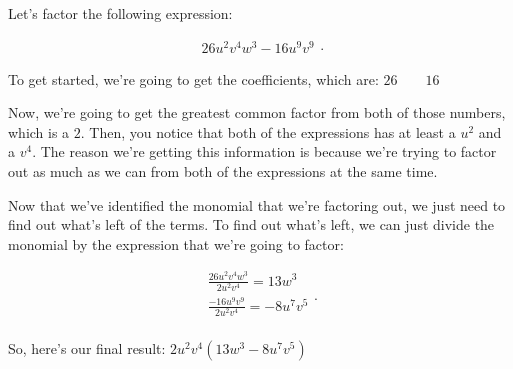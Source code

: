\label{les_4_unit_3:factor_out_a_monomial_from_a_polynomial}

Let's factor the following expression:

\begin{equation}
  \label{eqt:following_polynomial_expression}
  \begin{split}
    26u^{2}v^{4}w^{3} - 16u^{9}v^{9}
  \end{split}
.\end{equation}

To get started, we're going to get the coefficients, which are:
$26 \qquad 16$ 

Now, we're going to get the greatest common factor from both of those
numbers, which is a $2$. Then, you notice that both of the expressions has at
least a $u^{2}$ and a $v^{4}$. The reason we're getting this
information is because we're trying to factor out as much as we can from
both of the expressions at the same time.

Now that we've identified the monomial that we're factoring out, we just
need to find out what's left of the terms. To find out what's left, we can
just divide the monomial by the expression that we're going to factor:

\begin{equation}
  \label{eqt:divide_monomial_polynomial}
  \begin{split}
    \frac{26u^{2}v^{4}w^{3}}{2u^{2}v^{4}} = 13w^{3} \\
    \frac{-16u^{9}v^{9}}{2u^{2}v^{4}} = -8u^{7}v^{5} \\
  \end{split}
.\end{equation}

So, here's our final result: $2u^{2}v^{4}(13w^{3} - 8u^{7}v^{5})$

\newpage
